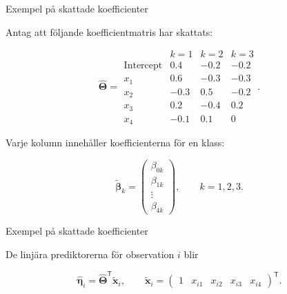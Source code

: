 \documentclass[10pt,english]{beamer}
\begin{document}
\begin{frame}{Exempel på skattade koefficienter}

    Antag att följande koefficientmatris har skattats:

    \[
        \widehat{\boldsymbol{\Theta}}
        =
        \begin{array}{c|rrr}
                            & k=1  & k=2  & k=3  \\ \hline
            \text{Intercept} & 0.4  & -0.2 & -0.2 \\
            x_1              & 0.6  & -0.3 & -0.3 \\
            x_2              & -0.3 & 0.5  & -0.2 \\
            x_3              & 0.2  & -0.4 & 0.2  \\
            x_4              & -0.1 & 0.1  & 0
        \end{array}.
    \]

    Varje kolumn innehåller koefficienterna för en klass:

    \[
        \widetilde{\boldsymbol{\beta}}_k
        =
        \begin{pmatrix}
            \beta_{0k} \\
            \beta_{1k} \\
            \vdots \\
            \beta_{4k}
        \end{pmatrix},
        \qquad
        k=1,2,3.
    \]


\end{frame}


\begin{frame}{Exempel på skattade koefficienter}

    

    De linjära prediktorerna för observation \(i\) blir

    \[
        \widehat{\boldsymbol{\eta}}_i
        =
        \widehat{\boldsymbol{\Theta}}^{\mathsf T}
        \widetilde{\boldsymbol{x}}_i,
        \qquad
        \widetilde{\boldsymbol{x}}_i
        =
        \begin{pmatrix}
            1 & x_{i1} & x_{i2} & x_{i3} & x_{i4}
        \end{pmatrix}^{\mathsf T}.
    \]

\end{frame}
\end{document}
